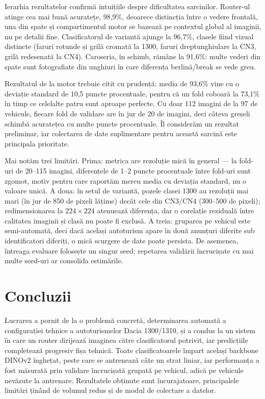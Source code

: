 \documentclass[12pt, a4paper, openany]{book}
\begin{document}
Ierarhia rezultatelor confirmă intuițiile despre dificultatea sarcinilor. Router-ul atinge cea mai bună acuratețe, 98,9\%, deoarece distincția între o vedere frontală, una din spate și compartimentul motor se bazează pe contextul global al imaginii, nu pe detalii fine. Clasificatorul de variantă ajunge la 96,7\%, clasele fiind vizual distincte (faruri rotunde și grilă cromată la 1300, faruri dreptunghiulare la CN3, grilă redesenată la CN4). Caroseria, în schimb, rămâne la 91,6\%: multe vederi din spate sunt fotografiate din unghiuri în care diferența berlină/break se vede greu.

Rezultatul de la motor trebuie citit cu prudență: media de 93,6\% vine cu o deviație standard de 10,5 puncte procentuale, pentru că un fold coboară la 73,1\% în timp ce celelalte patru sunt aproape perfecte. Cu doar 112 imagini de la 97 de vehicule, fiecare fold de validare are în jur de 20 de imagini, deci câteva greșeli schimbă acuratețea cu multe puncte procentuale. Îl considerăm un rezultat preliminar, iar colectarea de date suplimentare pentru această sarcină este principala prioritate.

Mai notăm trei limitări. Prima: metrica are rezoluție mică în general --- la fold-uri de 20--115 imagini, diferențele de 1--2 puncte procentuale între fold-uri sunt zgomot, motiv pentru care raportăm mereu media cu deviația standard, nu o valoare unică. A doua: în setul de variantă, pozele clasei 1300 au rezoluții mai mari (în jur de 850 de pixeli lățime) decât cele din CN3/CN4 (300--500 de pixeli); redimensionarea la $224 \times 224$ atenuează diferența, dar o corelație reziduală între calitatea imaginii și clasă nu poate fi exclusă. A treia: gruparea pe vehicul este semi-automată, deci dacă același autoturism apare în două anunțuri diferite sub identificatori diferiți, o mică scurgere de date poate persista. De asemenea, întreaga evaluare folosește un singur seed; repetarea validării încrucișate cu mai multe seed-uri ar consolida estimările.


\chapter{Concluzii}

Lucrarea a pornit de la o problemă concretă, determinarea automată a configurației tehnice a autoturismelor Dacia 1300/1310, și a condus la un sistem în care un router dirijează imaginea către clasificatorul potrivit, iar predicțiile completează progresiv fișa tehnică. Toate clasificatoarele împart același backbone DINOv2 înghețat, peste care se antrenează câte un strat liniar, iar performanța a fost măsurată prin validare încrucișată grupată pe vehicul, adică pe vehicule nevăzute la antrenare. Rezultatele obținute sunt încurajatoare, principalele limitări ținând de volumul redus și de modul de colectare a datelor.
\end{document}
